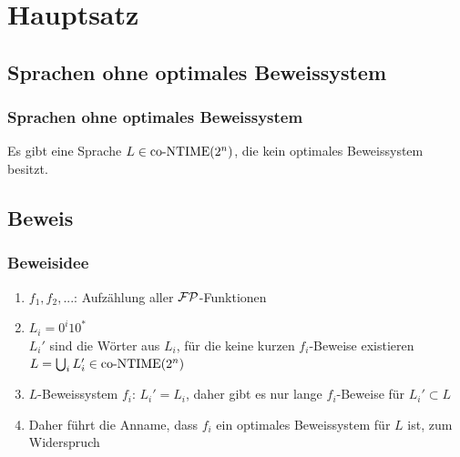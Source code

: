 \section{Hauptsatz} 
\subsection{Sprachen ohne optimales Beweissystem}

\begin{frame}
  \frametitle{Sprachen ohne optimales Beweissystem}
  
  \begin{theorem}
    Es gibt eine Sprache \(L \in \text{co-NTIME}(2^n)\), die kein optimales Beweissystem besitzt.
  \end{theorem}
\end{frame}

\subsection{Beweis}

\begin{frame}
  \frametitle{Beweisidee}

  \begin{enumerate}
   \item<1-> \(f_1, f_2, ...\): Aufzählung aller \(\mathcal{FP}\)-Funktionen
   \item<2-> \(L_i = 0^i10^*\) \\
               \(L_i'\) sind die Wörter aus \(L_i\), für die keine kurzen \(f_i\)-Beweise existieren \\
               \(L = \bigcup_i L_i' \in \text{co-NTIME}(2^n)\)
   \item<5-> \(L\)-Beweissystem \(f_i\): \(L_i' = L_i\), daher gibt es nur lange \(f_i\)-Beweise für \(L_i' \subset L\)
   \item<6-> Daher führt die Anname, dass \(f_i\) ein optimales Beweissystem für \(L\) ist, zum Widerspruch
  \end{enumerate}
\end{frame}

